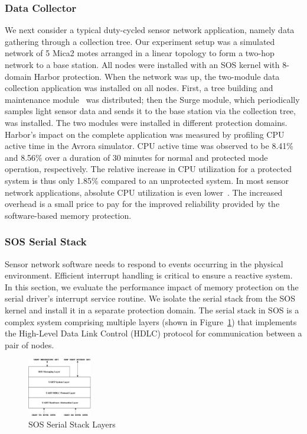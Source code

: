 \subsubsection{Data Collector}
%
We next consider a typical duty-cycled sensor network application,
namely data gathering through a collection tree.
%
Our experiment setup was a simulated network of 5 Mica2 motes arranged
in a linear topology to form a two-hop network to a base station.
%
All nodes were installed with an SOS kernel with 8-domain Harbor protection.
%
When the network was up, the two-module data collection application was
installed on all nodes.
%
First, a tree building and maintenance module~\cite{woo03surge} was
distributed; then
%
the Surge module, which periodically samples light sensor data and sends it
to the base station via the collection tree, was installed.
%
The two modules were installed in different protection domains.
%
Harbor's impact on the complete application was measured by profiling CPU
active time in the Avrora simulator.
%
CPU active time was observed to be 8.41\% and 8.56\% over a duration
of 30 minutes for normal and protected mode operation, respectively. 
%
The relative increase in CPU utilization for a protected system is
thus only 1.85\% compared to an unprotected system.
%
In most sensor network applications, absolute CPU utilization is even
lower~\cite{tkernel06sensys}.
%
The increased overhead is a small price to pay for the improved
reliability provided by the software-based memory protection.
\subsubsection{SOS Serial Stack}
%
Sensor network software needs to respond to events occurring in the
physical environment.
%
Efficient interrupt handling is critical to ensure a reactive system.
%
In this section, we evaluate the performance impact of memory
protection on the serial driver's interrupt service routine.
%
We isolate the serial stack from the SOS kernel and install it in a
separate protection domain.
%
The serial stack in SOS is a complex system comprising multiple
layers (shown in Figure~\ref{fig:serialstack}) that implements the
High-Level Data Link Control (HDLC) protocol for communication between
a pair of nodes.
%
\begin{figure}[htbp]
  \centering
   \includegraphics[height = 1.0in,
   keepaspectratio=true]{figures/serialstack.eps} 
   \caption{SOS Serial Stack Layers}
   \label{fig:serialstack}
\end{figure}
%

